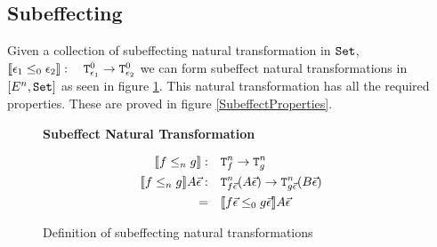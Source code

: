 \documentclass{report}
\begin{document}
\subsection{Subeffecting}
Given a collection of subeffecting natural transformation in $\texttt{Set}$, ${\bf [\![}\epsilon_1\leq_{0} \epsilon_2{\bf ]\!]}: \quad \texttt{T}^0_{\epsilon_1} \rightarrow \texttt{T}^0_{\epsilon_2}$ we can form subeffect natural transformations in $[E^n, \texttt{Set}]$ as seen in figure \ref{SubEffecting}. This natural transformation has all the required properties. These are proved in figure \ref{SubeffectProperties}.

\begin{figure}
    \begin{framed}
        \centering\textbf{Subeffect Natural Transformation}
    
        \begin{align*}
            {\bf [\![}f\leq_{n} g{\bf ]\!]}:&\quad\texttt{T}^n_{f}\rightarrow \texttt{T}^n_{g}\\
            {\bf [\![}f\leq_{n} g{\bf ]\!]} A \vec{\epsilon}:&\quad\texttt{T}^n_{f\vec{\epsilon}}(A\vec{\epsilon})\rightarrow \texttt{T}^n_{g\vec{\epsilon}}(B\vec{\epsilon})\\
            =&\quad {\bf [\![}f\vec{\epsilon}\leq_{0} g\vec{\epsilon}{\bf ]\!]}A\vec{\epsilon}
        \end{align*}
    \end{framed}
    \caption{Definition of subeffecting natural transformations}
    \label{SubEffecting}
\end{figure}
\end{document}

